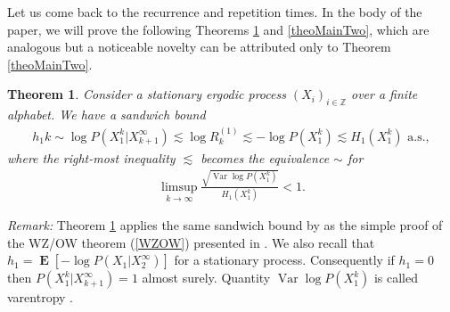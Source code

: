 \documentclass[a4paper,12pt]{article}
\newcommand{\kwad}[1]{\left[ #1 \right]}
\DeclareMathOperator{\var}{Var}
\DeclareMathOperator{\mean}{\mathbf{E}}
\newtheorem{theorem}{Theorem}
\begin{document}
Let us come back to the recurrence and repetition times.  In the body of
the paper, we will prove the following Theorems \ref{theoMainOne} and
\ref{theoMainTwo}, which are analogous but a noticeable novelty can be
attributed only to Theorem \ref{theoMainTwo}.
\begin{theorem}
  \label{theoMainOne}
  Consider a stationary ergodic process $(X_i)_{i\in\mathbb{Z}}$ over
  a finite alphabet. We have a sandwich bound
  \begin{align}
    h_1 k\sim
    \log P(X_1^k|X_{k+1}^\infty)\lesssim
    \log R^{(1)}_k\lesssim
    -\log P(X_1^k)\lesssim
    H_1(X_1^k)
    \text{ a.s.},
  \end{align}
  where the right-most inequality $\lesssim$ becomes the equivalence
  $\sim$ for
  \begin{align}
    \limsup_{k\to\infty} \frac{\sqrt{\var\log P(X_1^k)}}{H_1(X_1^k)}<1.
  \end{align}
\end{theorem}
\emph{Remark:} Theorem \ref{theoMainOne} applies the same sandwich
bound by \citet{Kontoyiannis98} as the simple proof of the WZ/OW
theorem (\ref{WZOW}) presented in \citep[Theorem 9.12]{Debowski21}.
We also recall that $h_1=\mean\kwad{-\log P(X_1|X_2^\infty)}$ for a
stationary process. Consequently if $h_1=0$ then
$P(X_1^k|X_{k+1}^\infty)=1$ almost surely. Quantity
$\var\log P(X_1^k)$ is called varentropy \citep{KontoyiannisVerdu13}.
\end{document}
